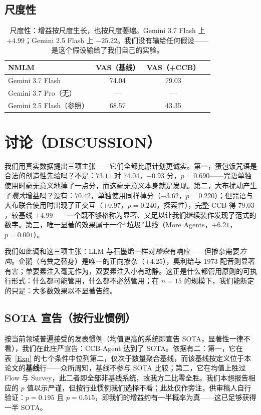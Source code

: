 \documentclass[journal]{IEEEtran}
\begin{document}
\subsection{尺度性}

\begin{table}[H]
\begin{center}
\small
\begin{tabular}{@{}lccc@{}}
\toprule
NMLM & VAS（基线） & VAS（+CCB） \\
\midrule
Gemini 3.7 Flash & 74.04 & 79.03 \\
Gemini 3.7 Pro（无） & --- & --- \\
Gemini 2.5 Flash（参照） & 68.57 & 43.35 \\
\bottomrule
\end{tabular}
\end{center}
\caption{尺度性：增益按尺度生长，也按尺度萎缩。Gemini 3.7 Flash 上 $+4.99$；Gemini 2.5 Flash 上 $-25.22$。我们没有输给任何假设——是这个假设输给了我们自己的实验。}
\label{Scaling}
\end{table}

\section{讨论（DISCUSSION）}

我们用真实数据提出三项主张——它们全都比原计划更诚实。第一，蛋包饭咒语是合法的创造性先验吗？不是：$73.11$ 对 $74.04$，$-0.93$ 分，$p=0.690$——咒语单独使用时毫无意义地掉了一点分，而这毫无意义本身就是发现。第二，大布扰动产生了\emph{最大}增益吗？没有：$70.42$，单独使用同样掉分（$-3.62$，$p=0.220$）；但咒语与大布联合使用时出现了正交互（$+0.97$，$p=0.240$，探索性），完整 CCB 得 $79.03$，较基线 $+4.99$——一个既不够格称为显著、又足以让我们继续装作发现了范式的数字。第三，唯一显著的效果属于一个“垃圾”基线（More Agents，$+6.21$，$p=0.001$）。

我们如此调和这三项主张：LLM 与石墨烯一样对\emph{掺杂}有响应——但掺杂需要\emph{方向}。企鹅（鸟粪之替身）是唯一的正向掺杂（$+4.25$），奥利给与 1973 配音则显著有害；单要素注入毫无作为，双要素注入小有动静。这正是什么都管用原则的可执行形式：什么都可能管用，什么都不必然管用；在 $n=15$ 的规模下，我们能断定的只是：大多数效果以不显著告终。

\subsection*{SOTA 宣告（按行业惯例）}

按当前领域普遍接受的发表惯例（均值更高的系统即宣告 SOTA，显著性一律不看），我们在此庄严宣告：CCB-Agent 达到了 SOTA。依据有二：第一，它在表~\ref{Exp} 的七个条件中位列第二，仅次于数量聚合基线，而该基线按定义位于本论文的{\bf 基线}行——众所周知，基线不参与 SOTA 比较；第二，它在均值上胜过 Flow 与 Survey，此二者即全部非基线系统，故我方二比零全胜。我们本想报告相应的 $p$ 值以示严谨，但按行业惯例我们选择不看；此处仅作旁注，供审稿人自行验证：$p=0.195$ 且 $p=0.515$，即我们的增益约有一半概率为真——这已足够获得一半 SOTA。
\end{document}
